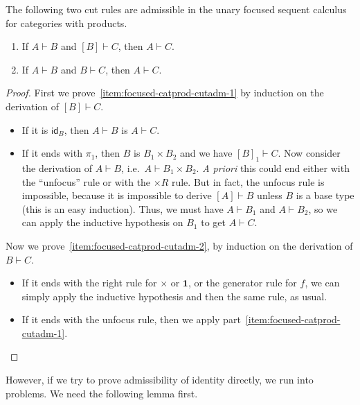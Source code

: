 \documentclass{book}
\def\idfunc{\mathsf{id}}
\let\types\vdash
\newcommand{\focus}[1]{[#1]}
\def\unit{\mathbf{1}}
\begin{document}
\begin{lem}\label{thm:focused-catprod-cutadm}
  The following two cut rules are admissible in the unary focused sequent calculus for categories with products.
  \begin{enumerate}
    \item If $A\types B$ and $\focus B\types C$, then $A\types C$.\label{item:focused-catprod-cutadm-1}
    \item If $A\types B$ and $B\types C$, then $A\types C$.\label{item:focused-catprod-cutadm-2}
  \end{enumerate}
\end{lem}
\begin{proof}
  First we prove~\ref{item:focused-catprod-cutadm-1} by induction on the derivation of $\focus B\types C$.
  \begin{itemize}
  \item If it is $\idfunc_B$, then $A\types B$ is $A\types C$.
  \item If it ends with $\pi_1$, then $B$ is $B_1\times B_2$ and we have $\focus B_1\types C$.
    Now consider the derivation of $A\types B$, i.e.\ $A\types B_1\times B_2$.
    \textit{A priori} this could end either with the ``unfocus'' rule or with the $\times R$ rule.
    But in fact, the unfocus rule is impossible, because it is impossible to derive $\focus A\types B$ unless $B$ is a base type (this is an easy induction).
    Thus, we must have $A\types B_1$ and $A\types B_2$, so we can apply the inductive hypothesis on $B_1$ to get $A\types C$.
  \end{itemize}
  Now we prove~\ref{item:focused-catprod-cutadm-2}, by induction on the derivation of $B\types C$.
  \begin{itemize}
  \item If it ends with the right rule for $\times$ or $\unit$, or the generator rule for $f$, we can simply apply the inductive hypothesis and then the same rule, as usual.
  \item If it ends with the unfocus rule, then we apply part~\ref{item:focused-catprod-cutadm-1}.\qedhere
  \end{itemize}
\end{proof}

However, if we try to prove admissibility of identity directly, we run into problems.
We need the following lemma first.
\end{document}
